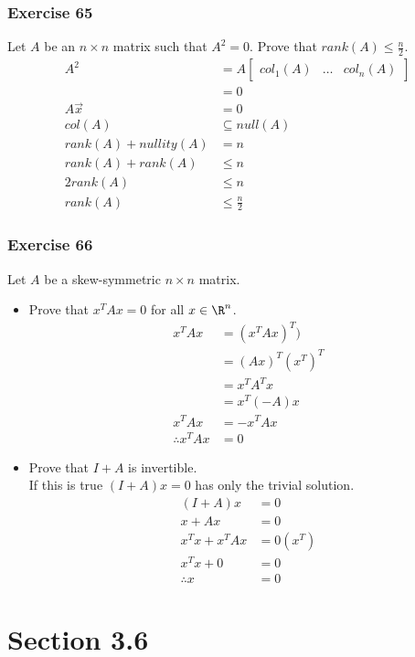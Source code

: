 \documentclass[letterpaper, 12pt]{math}
\begin{document}
\subsubsection*{Exercise 65}
Let \( A \) be an \( n\times n \) matrix such that \( A^2 = 0 \). Prove that
\( rank(A) \le \frac{n}{2} \).
\begin{align*}
  A^2 &= A\begin{bmatrix}col_1(A) & \dots & col_n(A)\end{bmatrix} \\
  &= 0 \\
  A\vec{x} &= 0 \\
  col(A) &\subseteq null(A) \\
  rank(A)+nullity(A) &= n \\
  rank(A)+rank(A) &\le n \\
  2rank(A) &\le n \\
  rank(A) &\le \frac{n}{2}
\end{align*}

\subsubsection*{Exercise 66}
Let \( A \) be a skew-symmetric \( n\times n \) matrix.
\begin{itemize}
  \item Prove that \( x^TAx = 0 \) for all \( x\in\R^n \).
  \begin{align*}
    x^TAx &= (x^TAx)^T) \\
    &= (Ax)^T(x^T)^T \\
    &= x^TA^Tx \\
    &= x^T(-A)x \\
    x^TAx &= -x^TAx \\
    \therefore x^TAx &= 0
  \end{align*}
  \item Prove that \( I+A \) is invertible. \\
  If this is true \( (I+A)x = 0 \) has only the trivial solution.
  \begin{align*}
    (I+A)x &= 0 \\
    x+Ax &= 0 \\
    x^Tx+x^TAx &= 0(x^T) \\
    x^Tx+0 &= 0 \\
    \therefore x &= 0
  \end{align*}
\end{itemize}

\section*{Section 3.6}
\end{document}
